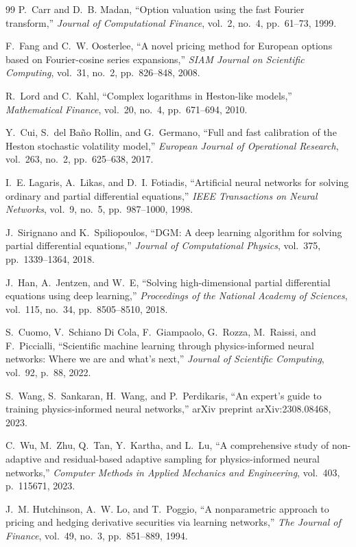 \documentclass[conference]{IEEEtran}
\begin{document}
\begin{thebibliography}{99}
 P.~Carr and D.~B. Madan, ``Option valuation using the fast Fourier transform,'' \emph{Journal of Computational Finance}, vol.~2, no.~4, pp.~61--73, 1999.

 F.~Fang and C.~W. Oosterlee, ``A novel pricing method for European options based on Fourier-cosine series expansions,'' \emph{SIAM Journal on Scientific Computing}, vol.~31, no.~2, pp.~826--848, 2008.

 R.~Lord and C.~Kahl, ``Complex logarithms in Heston-like models,'' \emph{Mathematical Finance}, vol.~20, no.~4, pp.~671--694, 2010.

 Y.~Cui, S.~del Ba\~{n}o Rollin, and G.~Germano, ``Full and fast calibration of the Heston stochastic volatility model,'' \emph{European Journal of Operational Research}, vol.~263, no.~2, pp.~625--638, 2017.

 I.~E. Lagaris, A.~Likas, and D.~I. Fotiadis, ``Artificial neural networks for solving ordinary and partial differential equations,'' \emph{IEEE Transactions on Neural Networks}, vol.~9, no.~5, pp.~987--1000, 1998.

 J.~Sirignano and K.~Spiliopoulos, ``DGM: A deep learning algorithm for solving partial differential equations,'' \emph{Journal of Computational Physics}, vol.~375, pp.~1339--1364, 2018.

 J.~Han, A.~Jentzen, and W.~E, ``Solving high-dimensional partial differential equations using deep learning,'' \emph{Proceedings of the National Academy of Sciences}, vol.~115, no.~34, pp.~8505--8510, 2018.

 S.~Cuomo, V.~Schiano Di Cola, F.~Giampaolo, G.~Rozza, M.~Raissi, and F.~Piccialli, ``Scientific machine learning through physics-informed neural networks: Where we are and what's next,'' \emph{Journal of Scientific Computing}, vol.~92, p.~88, 2022.

 S.~Wang, S.~Sankaran, H.~Wang, and P.~Perdikaris, ``An expert's guide to training physics-informed neural networks,'' arXiv preprint arXiv:2308.08468, 2023.

 C.~Wu, M.~Zhu, Q.~Tan, Y.~Kartha, and L.~Lu, ``A comprehensive study of non-adaptive and residual-based adaptive sampling for physics-informed neural networks,'' \emph{Computer Methods in Applied Mechanics and Engineering}, vol.~403, p.~115671, 2023.

 J.~M. Hutchinson, A.~W. Lo, and T.~Poggio, ``A nonparametric approach to pricing and hedging derivative securities via learning networks,'' \emph{The Journal of Finance}, vol.~49, no.~3, pp.~851--889, 1994.


\end{thebibliography}
\end{document}
